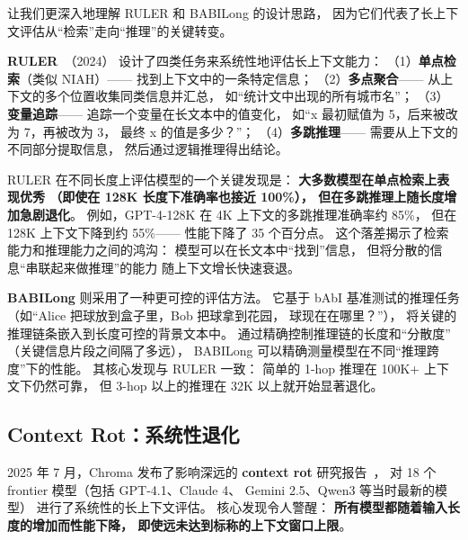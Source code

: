 让我们更深入地理解 RULER 和 BABILong 的设计思路，
因为它们代表了长上下文评估从“检索”走向“推理”的关键转变。

\textbf{RULER}~\cite{hsieh2024ruler}（2024）%
设计了四类任务来系统性地评估长上下文能力：
（1）\textbf{单点检索}（类似 NIAH）——
找到上下文中的一条特定信息；
（2）\textbf{多点聚合}——
从上下文的多个位置收集同类信息并汇总，
如“统计文中出现的所有城市名”；
（3）\textbf{变量追踪}——
追踪一个变量在长文本中的值变化，
如“x 最初赋值为 5，后来被改为 7，再被改为 3，
最终 x 的值是多少？”；
（4）\textbf{多跳推理}——
需要从上下文的不同部分提取信息，
然后通过逻辑推理得出结论。

RULER 在不同长度上评估模型的一个关键发现是：
\textbf{大多数模型在单点检索上表现优秀
（即使在 128K 长度下准确率也接近 100\%），
但在多跳推理上随长度增加急剧退化}。
例如，GPT-4-128K 在 4K 上下文的多跳推理准确率约 85\%，
但在 128K 上下文下降到约 55\%——
性能下降了 35 个百分点。
这个落差揭示了检索能力和推理能力之间的鸿沟：
模型可以在长文本中“找到”信息，
但将分散的信息“串联起来做推理”的能力
随上下文增长快速衰退。

\textbf{BABILong} 则采用了一种更可控的评估方法。
它基于 bAbI 基准测试的推理任务
（如“Alice 把球放到盒子里，Bob 把球拿到花园，
球现在在哪里？”），
将关键的推理链条嵌入到长度可控的背景文本中。
通过精确控制推理链的长度和“分散度”
（关键信息片段之间隔了多远），
BABILong 可以精确测量模型在不同“推理跨度”下的性能。
其核心发现与 RULER 一致：
简单的 1-hop 推理在 100K+ 上下文下仍然可靠，
但 3-hop 以上的推理在 32K 以上就开始显著退化。

\subsection{Context Rot：系统性退化}

2025 年 7 月，Chroma 发布了影响深远的
\textbf{context rot} 研究报告~\cite{chroma2025contextrot}，
对 18 个 frontier 模型（包括 GPT-4.1、Claude 4、
Gemini 2.5、Qwen3 等当时最新的模型）
进行了系统性的长上下文评估。
核心发现令人警醒：
\textbf{所有模型都随着输入长度的增加而性能下降，
即使远未达到标称的上下文窗口上限}。

